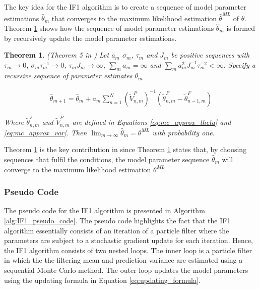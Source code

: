 \documentclass[twoside,openright]{report}
\newtheorem{theorem}{Theorem}[section]
\begin{document}
The key idea for the IF1 algorithm is to create a sequence of model parameter estimations $\hat{\theta}_m$ that converges to the maximum likelihood estimation $\hat{\theta}^{ML}$ of $\theta$. Theorem \ref{th:ionides_th5} shows how the sequence of model parameter estimations $\hat{\theta}_m$ is formed by recursively update the model parameter estimations. 

\begin{theorem} \label{th:ionides_th5}
(Theorem 5 in \cite{ionides2011iterated}) Let $a_m$ $\sigma_m$, $\tau_m$ and $J_m$ be positive sequences with $\tau_m \to 0$, $\sigma_m \tau_m ^{-1} \to 0 $, $\tau_m J_m \to \infty $, $\sum_m a_m = \infty$ and $\sum_m a_{m}^{2} J_{m}^{-1} \tau_{m}^{-2} < \infty$. Specify a recursive sequence of parameter estimates $\theta_m$ 


\begin{align}
    \hat{\theta}_{m+1} = \hat{\theta}_m + a_m \sum_{n=1}^{N} ( \widetilde{V}_{n,m}^{P} )^{-1} (\widetilde{\theta}_{n,m}^{F}  - \widetilde{\theta}_{n-1,m}^{F}) \label{eq:updating_formula}
\end{align}

Where $\widetilde{\theta}_{n,m}^{F}$ and $\widetilde{V}_{n,m}^{P}$ are defined in Equations \ref{eq:mc_approx_theta} and \ref{eq:mc_approx_var}. Then $\lim_{m \to \infty} \hat{\theta}_m = \theta^{ML} $ with probability one. 
\end{theorem}

Theorem \ref{th:ionides_th5} is the key contribution in \cite{ionides2011iterated} since Theorem \ref{th:ionides_th5}  states that, by choosing sequences that fulfil the conditions, the model  parameter sequence $\hat{\theta}_{m}$ will converge to the maximum likelihood estimation $\theta^{ML}$.




\subsubsection{Pseudo Code}
The pseudo code for the IF1 algorithm is presented in Algorithm \ref{alg:IF1_pseudo_code}. The pseudo code highlights the fact that the IF1 algorithm essentially consists of an iteration of a particle filter where the parameters are subject to a stochastic gradient update for each iteration.  Hence, the IF1 algorithm consists of two nested loops. The inner loop is a particle filter in which the the filtering mean and prediction variance are estimated using a sequential Monte Carlo method. The outer loop updates the model parameters using the updating formula in Equation \ref{eq:updating_formula}.
\end{document}
